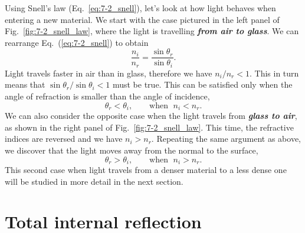 Using Snell's law (Eq.~\ref{eq:7-2_snell}), let's look at how light behaves when entering a new material.
We start with the case pictured in the left panel of Fig.~\ref{fig:7-2_snell_law}, where the light is travelling \textit{\textbf{from air to glass}}.
We can rearrange Eq.~(\ref{eq:7-2_snell}) to obtain
\begin{equation}
    \frac{n_i}{n_r} = \frac{\sin\theta_r}{\sin\theta_i}.
\end{equation}
Light travels faster in air than in glass, therefore we have $n_i / n_r < 1$.
This in turn means that $\sin\theta_r / \sin\theta_i < 1$ must be true.
This can be satisfied only when the angle of refraction is smaller than the angle of incidence,
\begin{equation}
    \theta_r < \theta_i, \qquad \text{when } \; n_i < n_r.
\end{equation}
We can also consider the opposite case when the light travels from \textit{\textbf{glass to air}}, as shown in the right panel of Fig.~\ref{fig:7-2_snell_law}.
This time, the refractive indices are reversed and we have $n_i > n_r$.
Repeating the same argument as above, we discover that the light moves away from the normal to the surface,
\begin{equation}
    \theta_r > \theta_i, \qquad \text{when } \; n_i > n_r.
\end{equation}
This second case when light travels from a denser material to a less dense one will be studied in more detail in the next section.


\section{Total internal reflection}

